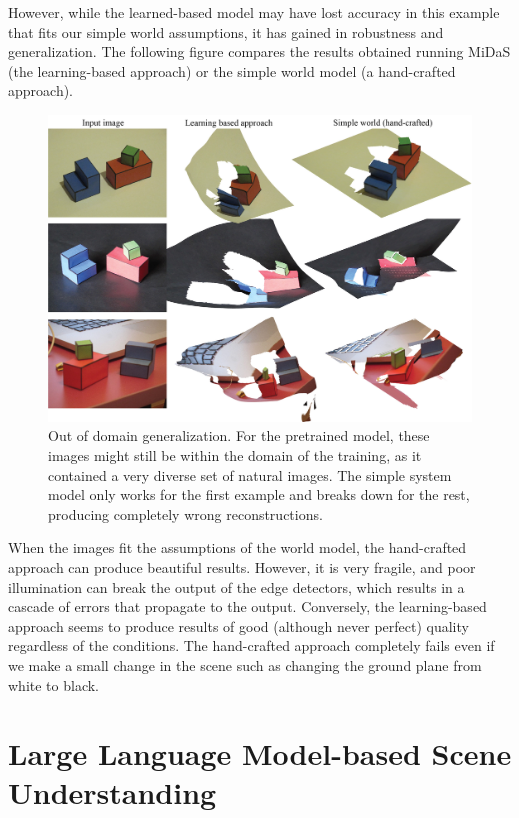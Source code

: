 However, while the learned-based model may have lost accuracy in this example that fits our simple world assumptions, it has gained in robustness and generalization.
The following figure compares the results obtained running MiDaS (the learning-based approach) or the simple world model (a hand-crafted approach).
\begin{figure}
    \centerline{
        \includegraphics[width=1\linewidth]{figures/simplesystem_revisited/comparison_midas_simpleworld.jpg}
    }
    \caption{Out of domain generalization. For the pretrained model, these images might still be within the domain of the training, as it contained a very diverse set of natural images. The simple system model only works for the first example and breaks down for the rest, producing completely wrong reconstructions.}
\end{figure}
When the images fit the assumptions of the world model, the hand-crafted approach can produce beautiful results. However, it is very fragile, and poor illumination can break the output of the edge detectors, which results in a cascade of errors that propagate to the output. Conversely, the learning-based approach seems to produce results of good (although never perfect) quality regardless of the conditions. The hand-crafted approach completely fails even if we make a small change in the scene such as changing the ground plane from white to black.


\section{Large Language Model-based Scene Understanding}

